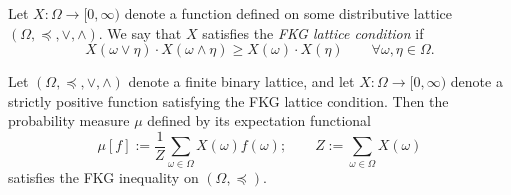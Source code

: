 \begin{definition}
    Let $X:\Omega\to[0,\infty)$ denote a
    function defined on some distributive lattice $(\Omega,\preceq,\vee,\wedge)$.
    We say that $X$ satisfies the \emph{FKG lattice condition}
    if 
    \begin{equation}
        X(\omega\vee\eta)\cdot X(\omega\wedge\eta)
        \geq
        X(\omega)\cdot X(\eta)
        \qquad
        \forall\omega,\eta\in\Omega.
    \end{equation}
\end{definition}

\begin{theorem}[FKG, 1971]
    \label{thm:original_FKG}
    Let $(\Omega,\preceq,\vee,\wedge)$ denote a finite binary lattice,
    and let $X:\Omega\to[0,\infty)$ denote a strictly positive function
    satisfying the FKG lattice condition.
    Then the probability measure $\mu$ defined by its expectation functional
    \[
        \mu[f]:=\frac1Z\sum_{\omega\in\Omega}X(\omega)f(\omega);
        \qquad Z:=\sum_{\omega\in\Omega}X(\omega)
    \]
    satisfies the FKG inequality on $(\Omega,\preceq)$.
\end{theorem}

